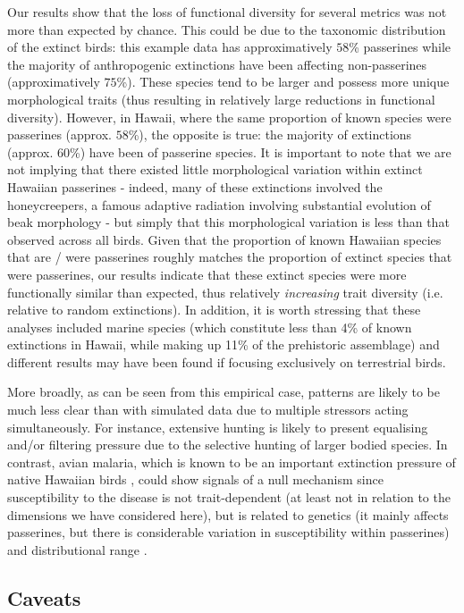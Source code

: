 \documentclass[12pt,letterpaper]{article}
\begin{document}
Our results show that the loss of  functional diversity for several metrics was not more than expected by chance.
This could be due to the taxonomic distribution of the extinct birds: this example data has approximatively $58$\% passerines while the majority of anthropogenic extinctions have been affecting non-passerines (approximatively $75$\%).
These species tend to be larger and possess more unique morphological traits (thus resulting in relatively large reductions in functional diversity).
However, in Hawaii, where the same proportion of known species were passerines (approx. $58$\%), the opposite is true: the majority of extinctions (approx. $60$\%) have been of passerine species.
It is important to note that we are not implying that there existed little morphological variation within extinct Hawaiian passerines - indeed, many of these extinctions involved the honeycreepers, a famous adaptive radiation involving substantial evolution of beak morphology \citep{Walther2022} - but simply that this morphological variation is less than that observed across all birds.
Given that the proportion of known Hawaiian species that are / were passerines roughly matches the proportion of extinct species that were passerines, our results indicate that these extinct species were more functionally similar than expected, thus relatively \textit{increasing} trait diversity (i.e. relative to random extinctions).
In addition, it is worth stressing that these analyses included marine species (which constitute less than 4\% of  known extinctions in Hawaii, while making up 11\% of the prehistoric assemblage) and different results may have been found if focusing exclusively on terrestrial birds.

More broadly, as can be seen from this empirical case, patterns are likely to be much less clear than with simulated data due to multiple stressors acting simultaneously.
For instance, extensive hunting is likely to present equalising and/or filtering pressure due to the selective hunting of larger bodied species.
In contrast, avian malaria, which is known to be an important extinction pressure of native Hawaiian birds \citep{samuel2011dynamics}, could show signals of a null mechanism since susceptibility to the disease is not trait-dependent (at least not in relation to the dimensions we have considered here), but is related to genetics (it mainly affects passerines, but there is considerable variation in susceptibility within passerines) and distributional range \citep{jessup2023wildlife}.

\subsection{Caveats}
\end{document}
